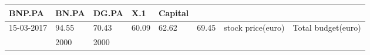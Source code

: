 \documentclass[
  11pt,
]{article}
\begin{document}
\begin{longtable}[]{@{}llllllll@{}}
\begin{minipage}[b]{0.07\columnwidth}
BNP.PA\strut
\end{minipage} & \begin{minipage}[b]{0.06\columnwidth}\raggedright
BN.PA\strut
\end{minipage} & \begin{minipage}[b]{0.06\columnwidth}\raggedright
DG.PA\strut
\end{minipage} & \begin{minipage}[b]{0.19\columnwidth}\raggedright
X.1\strut
\end{minipage} & \begin{minipage}[b]{0.16\columnwidth}\raggedright
Capital\strut
\end{minipage}\tabularnewline
\midrule
\endhead
\begin{minipage}[t]{0.10\columnwidth}\raggedright
15-03-2017\strut
\end{minipage} & \begin{minipage}[t]{0.06\columnwidth}\raggedright
94.55\strut
\end{minipage} & \begin{minipage}[t]{0.07\columnwidth}\raggedright
70.43\strut
\end{minipage} & \begin{minipage}[t]{0.07\columnwidth}\raggedright
60.09\strut
\end{minipage} & \begin{minipage}[t]{0.06\columnwidth}\raggedright
62.62\strut
\end{minipage} & \begin{minipage}[t]{0.06\columnwidth}\raggedright
69.45\strut
\end{minipage} & \begin{minipage}[t]{0.19\columnwidth}\raggedright
stock price(euro)\strut
\end{minipage} & \begin{minipage}[t]{0.16\columnwidth}\raggedright
Total budget(euro)\strut
\end{minipage}\tabularnewline
\begin{minipage}[t]{0.10\columnwidth}\raggedright
\strut
\end{minipage} & \begin{minipage}[t]{0.06\columnwidth}\raggedright
2000\strut
\end{minipage} & \begin{minipage}[t]{0.07\columnwidth}\raggedright
2000\strut
\end{minipage} & \begin{minipage}[t]{0.07\columnwidth}\raggedright

\end{minipage}
\end{longtable}
\end{document}
